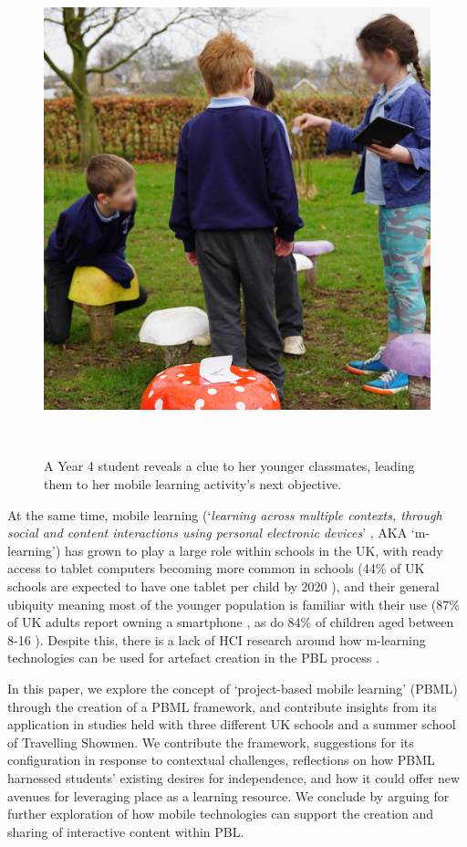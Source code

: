 \documentclass[,hyphens]{sigchi}
\begin{document}
\begin{figure}
\centering
  \includegraphics[width=0.66\columnwidth]{figures/mushrooms}
  \caption{A Year 4 student reveals a clue to her younger classmates, leading them to her mobile learning activity's next objective. }~\label{fig:Mushrooms}
  \vspace{-2.3em}
\end{figure}

At the same time, mobile learning (`\textit{learning across multiple contexts, through social and content interactions using personal electronic devices}' \cite{Crompton2013}, AKA `m-learning') has grown to play a large role within schools in the UK, with ready access to tablet computers becoming more common in schools (44\% of UK schools are expected to have one tablet per child by 2020 \cite{BritishEducationalSuppliersAssociation2015}), and their general ubiquity meaning most of the younger population is familiar with their use (87\% of UK adults report owning a smartphone \cite{Statistica2018}, as do 84\% of children aged between 8-16 \cite{Statistica2018a}). Despite this, there is a lack of HCI research around how m-learning technologies can be used for artefact creation in the PBL process \cite{Chan2015}.

In this paper, we explore the concept of `project-based mobile learning' (PBML) through the creation of a PBML framework, and contribute insights from its application in studies held with three different UK schools and a summer school of Travelling Showmen. We contribute the framework, suggestions for its configuration in response to contextual challenges, reflections on how PBML harnessed students' existing desires for independence, and how it could offer new avenues for leveraging place as a learning resource. We conclude by arguing for further exploration of how mobile technologies can support the creation and sharing of interactive content within PBL.
\end{document}
